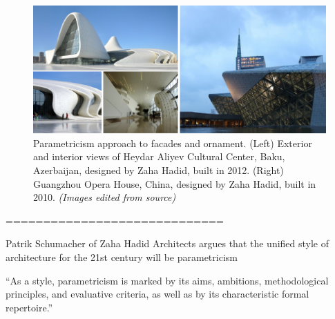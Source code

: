      \begin{figure}[htb]
          \centering
          \includegraphics[width= \linewidth]{Images/Parametricism}
          \caption{Parametricism approach to facades and ornament. (Left) Exterior and interior views of Heydar Aliyev Cultural Center, Baku, Azerbaijan, designed by Zaha Hadid, built in 2012. (Right) Guangzhou Opera House,  China, designed by Zaha Hadid, built in 2010. \textit{(Images edited from source)}}
          \label{fig:Parametricism}
        \end{figure}




=============================

Patrik Schumacher of Zaha Hadid Architects argues that the unified style of architecture for the 21st century will be parametricism\cite{Schumacher2010}

“As a style, parametricism is marked by its aims, ambitions, methodological principles, and evaluative criteria, as well as by its characteristic formal repertoire.”






